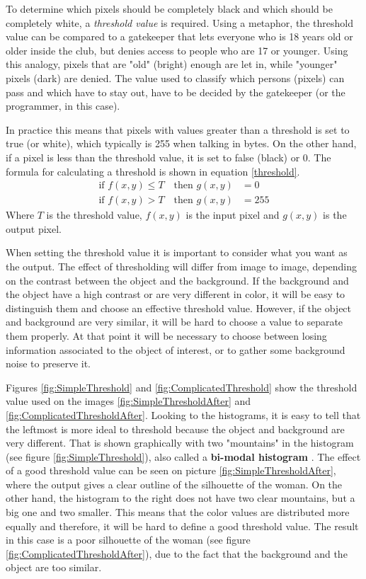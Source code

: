 To determine which pixels should be completely black and which should be completely white, a \textit{threshold value} is required. Using a metaphor, the threshold value can be compared to a gatekeeper that lets everyone who is 18 years old or older inside the club, but denies access to people who are 17 or younger. Using this analogy, pixels that are "old" (bright) enough are let in, while "younger" pixels (dark) are denied. The value used to classify which persons (pixels) can pass and which have to stay out, have to be decided by the gatekeeper (or the programmer, in this case).

In practice this means that pixels with values greater than a threshold is set to true (or white), which typically is 255 when talking in bytes. On the other hand, if a pixel is less than the threshold value, it is set to false (black) or 0. The formula for calculating a threshold is shown in equation \ref{threshold}.
\begin{equation}
  \begin{aligned}
  	\text{if } f(x,y)\leq T \quad \text{then } g(x,y)&= 0 \\
  	\text{if } f(x,y)>T \quad \text{then } g(x,y)&= 255
	\label{threshold}  
  \end{aligned} 
\end{equation}
Where $T$ is the threshold value, $f(x,y)$ is the input pixel and $g(x,y)$ is the output pixel. 

When setting the threshold value it is important to consider what you want as the output. The effect of thresholding will differ from image to image, depending on the contrast between the object and the background. If the background and the object have a high contrast or are very different in color, it will be easy to distinguish them and choose an effective threshold value. However, if the object and background are very similar, it will be hard to choose a value to separate them properly. At that point it will be necessary to choose between losing information associated to the object of interest, or to gather some background noise to preserve it.

Figures \ref{fig:SimpleThreshold} and \ref{fig:ComplicatedThreshold} show the threshold value used on the images \ref{fig:SimpleThresholdAfter} and \ref{fig:ComplicatedThresholdAfter}. Looking to the histograms, it is easy to tell that the leftmost is more ideal to threshold because the object and background are very different. That is shown graphically with two "mountains" in the histogram (see figure \ref{fig:SimpleThreshold}), also called a \textbf{bi-modal histogram} \citep{ip_book}. The effect of a good threshold value can be seen on picture \ref{fig:SimpleThresholdAfter}, where the output gives a clear outline of the silhouette of the woman. On the other hand, the histogram to the right does not have two clear mountains, but a big one and two smaller. This means that the color values are distributed more equally and therefore, it will be hard to define a good threshold value. The result in this case is a poor silhouette of the woman (see figure \ref{fig:ComplicatedThresholdAfter}), due to the fact that the background and the object are too similar.

